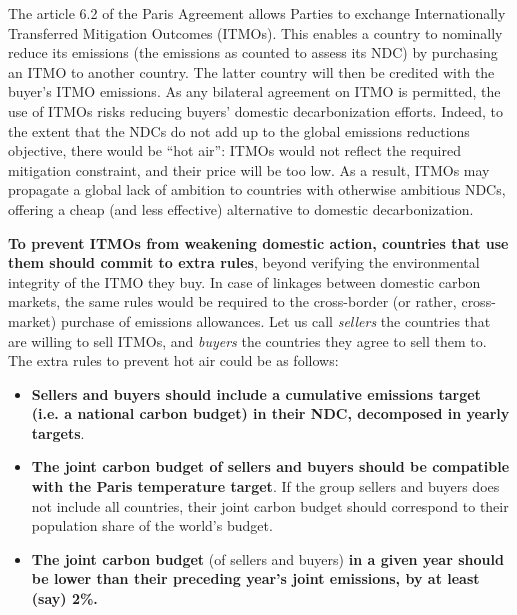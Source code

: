 \documentclass[12pt,english]{article}
\begin{document}
The article 6.2 of the Paris Agreement allows Parties to exchange Internationally Transferred Mitigation Outcomes (ITMOs). This enables a country to nominally reduce its emissions (the emissions as counted to assess its NDC) by purchasing an ITMO to another country. The latter country will then be credited with the buyer's ITMO emissions. As any bilateral agreement on ITMO is permitted, the use of ITMOs risks reducing buyers' domestic decarbonization efforts. %
Indeed, to the extent that the NDCs do not add up to the global emissions reductions objective, there would be ``hot air'': ITMOs would not reflect the required mitigation constraint, and their price will be too low. As a result, ITMOs may propagate a global lack of ambition to countries with otherwise ambitious NDCs, offering a cheap (and less effective) alternative to domestic decarbonization. 

\textbf{To prevent ITMOs from weakening domestic action, countries that use them should commit to extra rules}, beyond verifying the environmental integrity of the ITMO they buy. In case of linkages between domestic carbon markets, the same rules would be required to the cross-border (or rather, cross-market) purchase of emissions allowances. Let us call \textit{sellers} the countries that are willing to sell ITMOs, and \textit{buyers} the countries they agree to sell them to. The extra rules to prevent hot air could be as follows: 
\begin{itemize}
  \item \textbf{Sellers and buyers should include a cumulative emissions target (i.e. a national carbon budget) in their NDC, decomposed in yearly targets}.
  \item \textbf{The joint carbon budget of sellers and buyers should be compatible with the Paris temperature target}. If the group sellers and buyers does not include all countries, their joint carbon budget should correspond to their population share of the world's budget.
  \item \textbf{The joint carbon budget} (of sellers and buyers) \textbf{in a given year should be lower than their preceding year's joint emissions, by at least (say) 2\%.}
\end{itemize}
\end{document}
